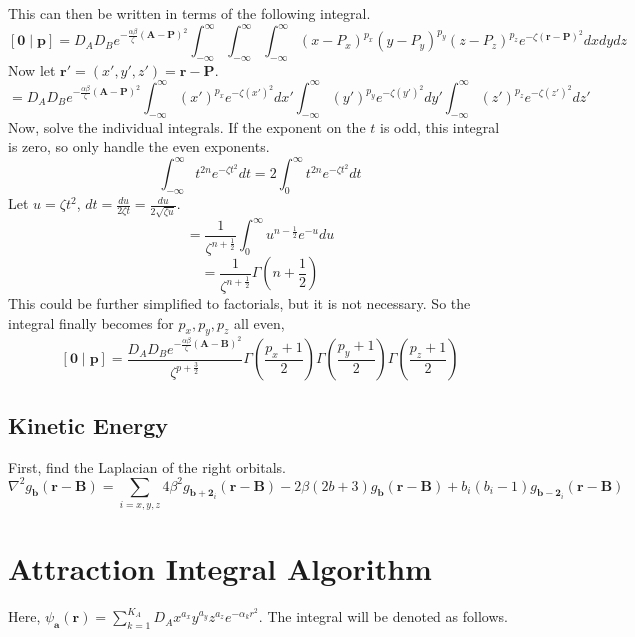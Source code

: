 \documentclass[12pt]{article}
\begin{document}
This can then be written in terms of the following integral.
$$\left[\mathbf{0}\middle|\mathbf{p}\right] = D_AD_Be^{-\frac{\alpha\beta}{\zeta}\left(\mathbf{A} - \mathbf{P}\right)^2} \int_{-\infty}^\infty \int_{-\infty}^\infty \int_{-\infty}^\infty \left(x - P_x\right)^{p_x}\left(y - P_y\right)^{p_y}\left(z - P_z\right)^{p_z} e^{-\zeta \left(\mathbf{r} - \mathbf{P}\right)^2} dxdydz$$
Now let $\mathbf{r'} = \left(x', y', z'\right) = \mathbf{r} - \mathbf{P}$.
$$= D_AD_Be^{-\frac{\alpha\beta}{\zeta}\left(\mathbf{A} - \mathbf{P}\right)^2} \int_{-\infty}^\infty \left(x'\right)^{p_x}e^{-\zeta \left(x'\right)^2} dx'\int_{-\infty}^\infty \left(y'\right)^{p_y}e^{-\zeta \left(y'\right)^2} dy'\int_{-\infty}^\infty \left(z'\right)^{p_z}e^{-\zeta \left(z'\right)^2} dz'$$
Now, solve the individual integrals. If the exponent on the $t$ is odd, this integral is zero, so only handle the even exponents.
$$\int_{-\infty}^\infty t^{2n} e^{-\zeta t^2} dt = 2\int_0^\infty t^{2n} e^{-\zeta t^2}dt$$
Let $u = \zeta t^2$, $dt = \frac{du}{2\zeta t} = \frac{du}{2\sqrt{\zeta u}}$.
$$= \frac{1}{\zeta^{n + \frac{1}{2}}} \int_0^\infty u^{n - \frac{1}{2}} e^{-u} du$$
$$= \frac{1}{\zeta^{n + \frac{1}{2}}}\Gamma\left(n + \frac{1}{2}\right)$$
This could be further simplified to factorials, but it is not necessary. So the integral finally becomes for $p_x, p_y, p_z$ all even,
$$\left[\mathbf{0}\middle|\mathbf{p}\right] = \frac{D_AD_Be^{-\frac{\alpha\beta}{\zeta}\left(\mathbf{A} - \mathbf{B}\right)^2}}{\zeta^{p + \frac{3}{2}}}\Gamma\left(\frac{p_x + 1}{2}\right)\Gamma\left(\frac{p_y + 1}{2}\right)\Gamma\left(\frac{p_z + 1}{2}\right)$$

\subsection*{Kinetic Energy}

First, find the Laplacian of the right orbitals.
$$\nabla^2 g_{\mathbf{b}}\left(\mathbf{r} - \mathbf{B}\right) = \sum_{i=x,y,z}4\beta^2 g_{\mathbf{b} + \mathbf{2}_i}\left(\mathbf{r} - \mathbf{B}\right) - 2\beta\left(2b + 3\right)g_{\mathbf{b}}\left(\mathbf{r} - \mathbf{B}\right) + b_i\left(b_i - 1\right) g_{\mathbf{b} - \mathbf{2}_i}\left(\mathbf{r} - \mathbf{B}\right)$$



\section*{Attraction Integral Algorithm}
Here, $\psi_{\mathbf{a}}(\mathbf{r}) = \sum_{k=1}^{K_A} D_A x^{a_x}y^{a_y}z^{a_z}e^{-\alpha_kr^2}$. The integral will be denoted as follows.
\end{document}
